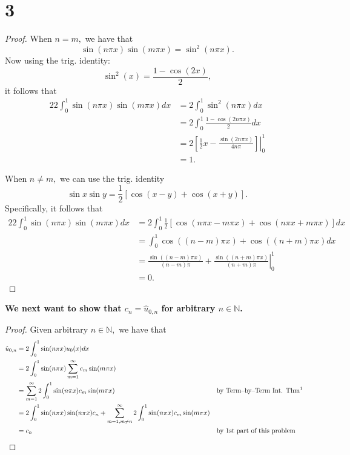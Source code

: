 \documentclass[10pt]{article}
\begin{document}
\newpage
\section*{3}
\begin{proof}
    When $n=m,$ we have that
    \[\sin(n\pi x)\sin(m\pi x)= \sin^2(n\pi x).\]
    Now using the trig. identity:
    \[\sin^2(x)=\frac{1-\cos(2x)}{2},\]
    it follows that
    \begin{alignat*}{2}
        2\int_{0}^{1} \sin(n\pi x)\sin(m\pi x)dx &=2\int_{0}^{1} \sin^2(n\pi x)dx\\
        &= 2\int_{0}^{1} \frac{1-\cos(2n\pi x)}{2} dx\\
        &= 2\left. \left [\frac{1}{2}x - \frac{\sin(2n\pi x)}{4n\pi}\right ]  \right\vert_0^1\\
        &= 1.
    \end{alignat*}

    When $n\neq m,$ we can use the trig. identity
    \[\sin x\sin y = \frac{1}{2}[\cos(x-y)+\cos(x+y)].\]
    Specifically, it follows that
    \begin{alignat*}{2}
        2\int_{0}^{1} \sin(n\pi x)\sin(m\pi x)dx &= 2\int_{0}^{1} \frac{1}{2}[\cos(n\pi x-m\pi x)+\cos(n\pi x+m\pi x)]dx\\
        &= \int_{0}^{1} \cos((n-m)\pi x)+\cos((n+m)\pi x) dx\\
        &= \left. \frac{\sin((n-m)\pi x)}{(n-m)\pi } + \frac{\sin((n+m)\pi x)}{(n+m)\pi } \right\vert_0^1\\
        &= 0.
    \end{alignat*}
\end{proof}

\noindent
\textbf{We next want to show that $c_n = \hat{u}_{0,n}$ for arbitrary $n\in\mathbb{N}$.}

\begin{proof}
    Given arbitrary $n\in\mathbb{N},$ we have that
    \begin{alignat*}{2}
        \hat{u}_{0,n} &= 2 \int_{0}^{1}\sin(n\pi x)u_0(x)dx\\
        &=  2 \int_{0}^{1}\sin(n\pi x) \sum_{m=1}^{\infty}c_m\sin(m\pi x)\\
        &= \sum_{m=1}^{\infty} 2 \int_{0}^{1}\sin(n\pi x)c_m\sin(m\pi x) &&\text{by Term--by--Term Int. Thm\footnotemark}\\
        &= 2 \int_{0}^{1}\sin(n\pi x)\sin(n\pi x) c_n + \sum_{m=1, m\neq n}^{\infty} 2 \int_{0}^{1}\sin(n\pi x)c_m\sin(m\pi x)\\
        &= c_n &&\text{by 1st part of this problem}
    \end{alignat*}
\end{proof}
\end{document}
